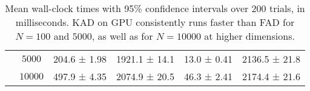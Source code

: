 \begin{table}[t!]
{\begin{tabular}{@{}ccrrrr@{}}
                        & $5000$               & 204.6 ± 1.98                                        & 1921.1 ± 14.1                                       & 13.0 ± 0.41                                       & 2136.5 ± 21.8                                       \\
                        & $10000$              & 497.9 ± 4.35                                     & 2074.9 ± 20.5                                       & 46.3 ± 2.41                                       & 2174.4 ± 21.6                                       \\ \bottomrule
\end{tabular}%
}
\vspace{5pt}
\caption{Mean wall-clock times with 95\% confidence intervals over 200 trials, in milliseconds. KAD on GPU consistently runs faster than FAD for $N=100$ and $5000$, as well as for $N=10000$ at higher dimensions.}
\label{table:compute_comparison}
\end{table}


